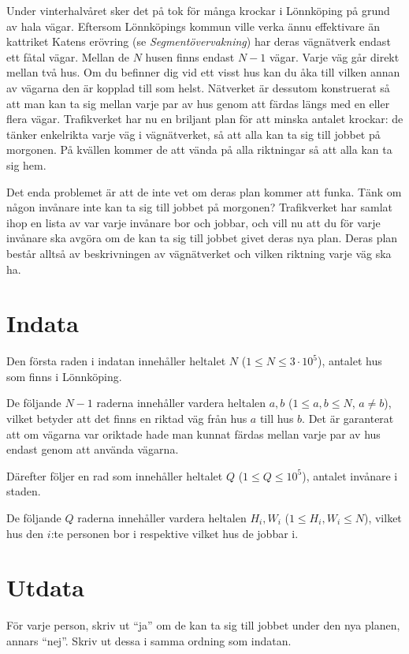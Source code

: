 
\noindent
Under vinterhalvåret sker det på tok för många krockar i Lönnköping på grund av hala vägar. 
Eftersom Lönnköpings kommun ville verka ännu effektivare än kattriket Katens erövring (se \textit{Segmentövervakning})
har deras vägnätverk endast ett fåtal vägar. Mellan de $N$ husen finns endast $N-1$ vägar.
Varje väg går direkt mellan två hus. Om du befinner dig vid ett visst hus kan du åka till vilken
annan av vägarna den är kopplad till som helst. Nätverket är dessutom konstruerat så att
man kan ta sig mellan varje par av hus genom att färdas längs med en eller flera vägar.
Trafikverket har nu en briljant plan för att minska antalet krockar: de tänker enkelrikta
varje väg i vägnätverket, så att alla kan ta sig till jobbet på morgonen. På kvällen
kommer de att vända på alla riktningar så att alla kan ta sig hem. 

Det enda problemet är att de inte vet om deras plan kommer att funka. Tänk om någon invånare
inte kan ta sig till jobbet på morgonen? Trafikverket har samlat ihop en lista av var varje
invånare bor och jobbar, och vill nu att du för varje invånare ska avgöra om de kan ta sig
till jobbet givet deras nya plan. Deras plan består alltså av beskrivningen av vägnätverket och
vilken riktning varje väg ska ha.

\section*{Indata}
Den första raden i indatan innehåller heltalet $N$ ($1 \le N \le 3 \cdot 10^5$), antalet hus
som finns i Lönnköping.

De följande $N-1$ raderna innehåller vardera heltalen $a,b$ ($1 \leq a,b \leq N$, $a \neq b$),
vilket betyder att det finns en riktad väg från hus $a$ till hus $b$. Det är garanterat
att om vägarna var oriktade hade man kunnat färdas mellan varje par av hus endast genom att använda
vägarna.

Därefter följer en rad som innehåller heltalet $Q$ ($1 \leq Q \leq 10^5$), antalet invånare i
staden.

De följande $Q$ raderna innehåller vardera heltalen $H_i,W_i$ ($1 \leq H_i,W_i \leq N$), vilket hus
den $i$:te personen bor i respektive vilket hus de jobbar i.

\section*{Utdata}
För varje person, skriv ut ``ja'' om de kan ta sig till jobbet under den nya planen, annars
``nej''. Skriv ut dessa i samma ordning som indatan.

